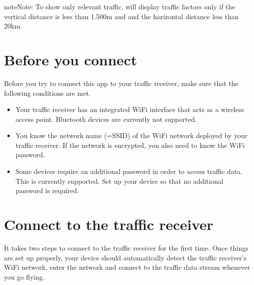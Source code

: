 \documentclass[letterpaper,10pt,english]{sphinxmanual}
\begin{document}
\begin{sphinxadmonition}{note}{Note:}
\sphinxAtStartPar
To show only relevant traffic,  will
display traffic factors only if the vertical distance is less than 1.500m
and and the horizontal distance less than 20km.
\end{sphinxadmonition}


\section{Before you connect}
\label{\detokenize{02-steps/traffic:before-you-connect}}
\sphinxAtStartPar
Before you try to connect this app to your traffic receiver, make sure that the
following conditions are met.
\begin{itemize}
\item {} 
\sphinxAtStartPar
Your traffic receiver has an integrated Wi\sphinxhyphen{}Fi interface that acts as a
wireless access point. Bluetooth devices are currently not supported.

\item {} 
\sphinxAtStartPar
You know the network name (=SSID) of the Wi\sphinxhyphen{}Fi network deployed by your
traffic receiver. If the network is encrypted, you also need to know the Wi\sphinxhyphen{}Fi
password.

\item {} 
\sphinxAtStartPar
Some devices require an additional password in order to access traffic
data. This is currently  supported. Set up your device so that no
additional password is required.

\end{itemize}


\section{Connect to the traffic receiver}
\label{\detokenize{02-steps/traffic:connect-to-the-traffic-receiver}}
\sphinxAtStartPar
It takes two steps to connect  to the traffic
receiver for the first time. Once things are set up properly, your device should
automatically detect the traffic receiver’s Wi\sphinxhyphen{}Fi network, enter the network and
connect to the traffic data stream whenever you go flying.
\end{document}
